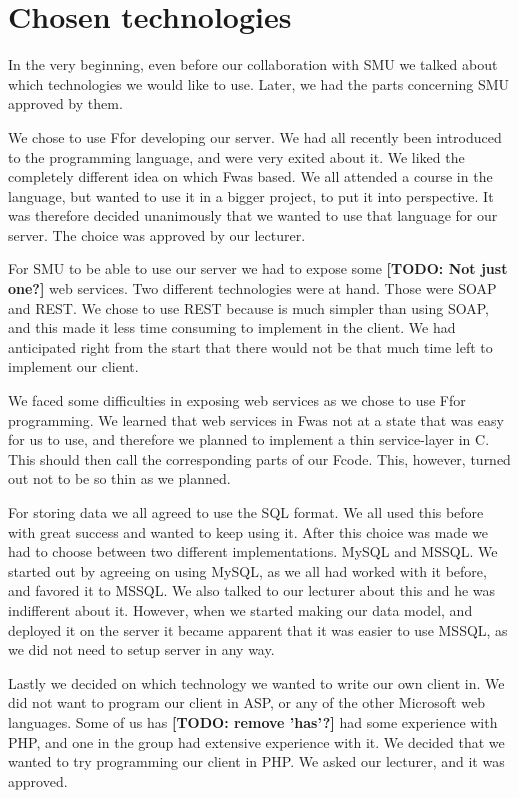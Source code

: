 \section{Chosen technologies}
In the very beginning, even before our collaboration with SMU we talked about which technologies we would like to use. Later, we had the parts concerning SMU approved by them.

We chose to use F\Sh for developing our server. We had all recently been introduced to the programming language, and were very exited about it. We liked the completely different idea on which F\Sh was based. We all attended a course in the language, but wanted to use it in a bigger project, to put it into perspective. It was therefore decided unanimously that we wanted to use that language for our server. The choice was approved by our lecturer.

For SMU to be able to use our server we had to expose some \textbf{[TODO: Not just one?]} web services. Two different technologies were at hand. Those were SOAP and REST. We chose to use REST because is much simpler than using SOAP, and this made it less time consuming to implement in the client. We had anticipated right from the start that there would not be that much time left to implement our client.

We faced some difficulties in exposing web services as we chose to use F\Sh for programming. We learned that web services in F\Sh was not at a state that was easy for us to use, and therefore we planned to implement a thin service-layer in C\Sh. This should then call the corresponding parts of our F\Sh code. This, however, turned out not to be so thin as we planned.

For storing data we all agreed to use the SQL format. We all used this before with great success and wanted to keep using it. After this choice was made we had to choose between two different implementations. MySQL and MSSQL. We started out by agreeing on using MySQL, as we all had worked with it before, and favored it to MSSQL. We also talked to our lecturer about this and he was indifferent about it. However, when we started making our data model, and deployed it on the server it became apparent that it was easier to use MSSQL, as we did not need to setup server in any way.

Lastly we decided on which technology we wanted to write our own client in. We did not want to program our client in ASP, or any of the other Microsoft web languages. Some of us has \textbf{[TODO: remove 'has'?]} had some experience with PHP, and one in the group had extensive experience with it. We decided that we wanted to try programming our client in PHP. We asked our lecturer, and it was approved.
\newpage